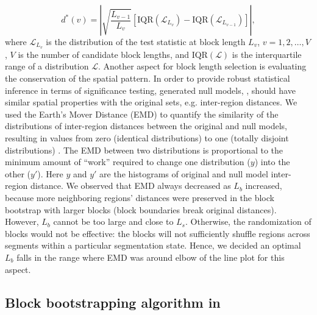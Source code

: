 \documentclass{article}
\begin{document}
$$ d^*(v)= \left| \sqrt{\frac{L_{v-1}}{L_v}} [\text{IQR}(\mathcal{L}_{L_v})-\text{IQR}(\mathcal{L}_{L_{v-1}})] \right|,$$
where $\mathcal{L}_{L_v}$ is the distribution of the test statistic at
block length $L_v$, $v = 1,2,\dots,V$, $V$ is the number of candidate
block lengths, and $\text{IQR}(\mathcal{L})$ is the interquartile
range of a distribution $\mathcal{L}$.
Another aspect for block length selection is evaluating the
conservation of the spatial pattern. In order to provide robust
statistical inference in terms of significance testing,
generated null models, , should have similar spatial properties with
the original sets, e.g. inter-region distances. 
We used the Earth's Mover
Distance (EMD) to quantify the similarity of the distributions of
inter-region distances between the original and null models, resulting 
in values from zero (identical distributions) to one (totally disjoint
distributions) \citep{emd}.
The EMD between two distributions is proportional to
the minimum amount of ``work'' required to change one distribution ($y$)
into the other ($y'$). Here $y$ and $y'$ are the histograms of
original and null model inter-region distance.
We observed that EMD always decreased as $L_b$ increased, because more
neighboring regions' distances were preserved in the
block bootstrap with larger blocks (block boundaries break original
distances).
However, $L_b$ cannot be too large and close to $L_s$.
Otherwise, the randomization of blocks would not
be effective: the blocks will not sufficiently shuffle regions across
segments within a particular segmentation state.
Hence, we decided an optimal $L_b$ falls in the range where EMD
was around elbow of the line plot for this aspect. 

\subsection{Block bootstrapping algorithm in \bootranges}\label{sec:algorithm}
\end{document}
